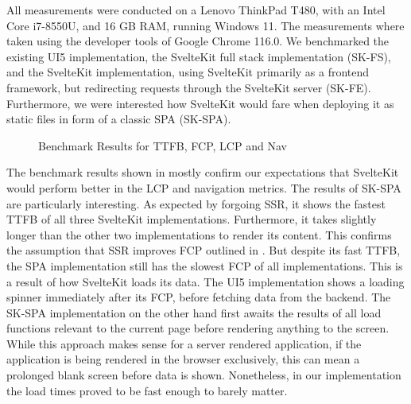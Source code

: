 All measurements were conducted on a Lenovo ThinkPad T480, with an Intel Core i7-8550U, and 16 GB RAM, running Windows 11. The measurements where taken using the developer tools of Google Chrome 116.0. We benchmarked the existing UI5 implementation, the SvelteKit full stack implementation (SK-FS), and the SvelteKit implementation, using SvelteKit primarily as a frontend framework, but redirecting requests through the SvelteKit server (SK-FE). Furthermore, we were interested how SvelteKit would fare when deploying it as static files in form of a classic SPA (SK-SPA). 

\begin{figure}
    \centering
    \caption{Benchmark Results for TTFB, FCP, LCP and Nav}
    \label{fig:benchmark}
\end{figure}

The benchmark results shown in  mostly confirm our expectations that SvelteKit would perform better in the LCP and navigation metrics. The results of SK-SPA are particularly interesting. As expected by forgoing SSR, it shows the fastest TTFB of all three SvelteKit implementations. Furthermore, it takes slightly longer than the other two implementations to render its content. This confirms the assumption that SSR improves FCP outlined in . But despite its fast TTFB, the SPA implementation still has the slowest FCP of all implementations. This is a result of how SvelteKit loads its data. The UI5 implementation shows a loading spinner immediately after its FCP, before fetching data from the backend. The SK-SPA implementation on the other hand first awaits the results of all load functions relevant to the current page before rendering anything to the screen. While this approach makes sense for a server rendered application, if the application is being rendered in the browser exclusively, this can mean a prolonged blank screen before data is shown. Nonetheless, in our implementation the load times proved to be fast enough to barely matter. 

